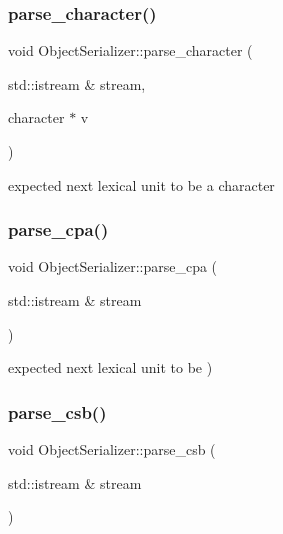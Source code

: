 \subsubsection{\texorpdfstring{parse\+\_\+character()}{parse\_character()}}
{\footnotesize\ttfamily void Object\+Serializer\+::parse\+\_\+character (\begin{DoxyParamCaption}\item[{std\+::istream \&}]{stream,  }\item[{character $\ast$}]{v }\end{DoxyParamCaption})\hspace{0.3cm}{\ttfamily [static]}}

expected next lexical unit to be a character \mbox{\label{classez_1_1objects_1_1ObjectSerializer_af90884b54943ccd2f17a2ac9cfd8bfc1}} 
\subsubsection{\texorpdfstring{parse\+\_\+cpa()}{parse\_cpa()}}
{\footnotesize\ttfamily void Object\+Serializer\+::parse\+\_\+cpa (\begin{DoxyParamCaption}\item[{std\+::istream \&}]{stream }\end{DoxyParamCaption})\hspace{0.3cm}{\ttfamily [static]}}

expected next lexical unit to be \textquotesingle{})\textquotesingle{} \mbox{\label{classez_1_1objects_1_1ObjectSerializer_af1df61d63076f1f47629162bdd344ff0}} 
\subsubsection{\texorpdfstring{parse\+\_\+csb()}{parse\_csb()}}
{\footnotesize\ttfamily void Object\+Serializer\+::parse\+\_\+csb (\begin{DoxyParamCaption}\item[{std\+::istream \&}]{stream }\end{DoxyParamCaption})\hspace{0.3cm}{\ttfamily [static]}}

